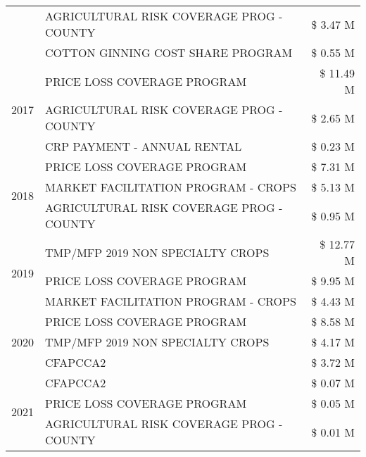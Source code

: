 \begin{tabular}{llr}
 & AGRICULTURAL RISK COVERAGE PROG - COUNTY      & \$ 3.47 M \\
 & COTTON GINNING COST SHARE PROGRAM             & \$ 0.55 M \\
\cline{1-3}
\multirow[t]{3}{*}{2017} & PRICE LOSS COVERAGE PROGRAM & \$ 11.49 M \\
 & AGRICULTURAL RISK COVERAGE PROG - COUNTY & \$ 2.65 M \\
 & CRP PAYMENT - ANNUAL RENTAL & \$ 0.23 M \\
\cline{1-3}
\multirow[t]{3}{*}{2018} & PRICE LOSS COVERAGE PROGRAM & \$ 7.31 M \\
 & MARKET FACILITATION PROGRAM - CROPS & \$ 5.13 M \\
 & AGRICULTURAL RISK COVERAGE PROG - COUNTY & \$ 0.95 M \\
\cline{1-3}
\multirow[t]{3}{*}{2019} & TMP/MFP 2019 NON SPECIALTY CROPS & \$ 12.77 M \\
 & PRICE LOSS COVERAGE PROGRAM & \$ 9.95 M \\
 & MARKET FACILITATION PROGRAM - CROPS & \$ 4.43 M \\
\cline{1-3}
\multirow[t]{3}{*}{2020} & PRICE LOSS COVERAGE PROGRAM & \$ 8.58 M \\
 & TMP/MFP 2019 NON SPECIALTY CROPS & \$ 4.17 M \\
 & CFAPCCA2 & \$ 3.72 M \\
\cline{1-3}
\multirow[t]{3}{*}{2021} & CFAPCCA2 & \$ 0.07 M \\
 & PRICE LOSS COVERAGE PROGRAM & \$ 0.05 M \\
 & AGRICULTURAL RISK COVERAGE PROG - COUNTY & \$ 0.01 M \\
\cline{1-3}
\bottomrule
\end{tabular}
